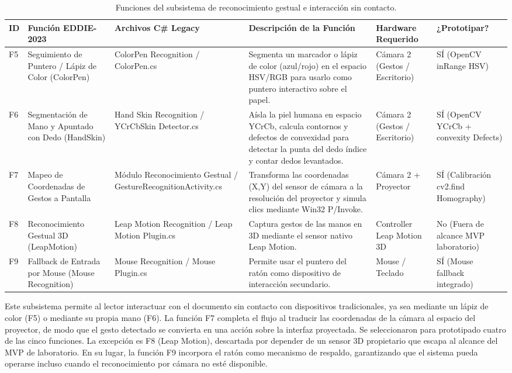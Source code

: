 \begin{table}[H]
    \centering
    \caption{Funciones del subsistema de reconocimiento gestual e interacción sin contacto.}
    \label{tab:func_reconocimiento_gestual}
    \begin{small}
    \begin{tabular}{L{0.6cm} L{2.2cm} L{2.2cm} L{4.1cm} L{1.6cm} L{1.8cm}}
        \toprule
        ID & Función EDDIE-2023 & Archivos C\# Legacy & Descripción de la Función & Hardware Requerido & ¿Prototipar? \\ \midrule
        F5 & Seguimiento de Puntero / Lápiz de Color (ColorPen) & ColorPen Recognition / ColorPen.cs & Segmenta un marcador o lápiz de color (azul/rojo) en el espacio HSV/RGB para usarlo como puntero interactivo sobre el papel. & Cámara 2 (Gestos / Escritorio) & SÍ (OpenCV inRange HSV) \\ \midrule
        F6 & Segmentación de Mano y Apuntado con Dedo (HandSkin) & Hand Skin Recognition / YCrCbSkin Detector.cs & Aísla la piel humana en espacio YCrCb, calcula contornos y defectos de convexidad para detectar la punta del dedo índice y contar dedos levantados. & Cámara 2 (Gestos / Escritorio) & SÍ (OpenCV YCrCb + convexity Defects) \\ \midrule
        F7 & Mapeo de Coordenadas de Gestos a Pantalla & Módulo Reconocimiento Gestual / GestureRecognitionActivity.cs & Transforma las coordenadas (X,Y) del sensor de cámara a la resolución del proyector y simula clics mediante Win32 P/Invoke. & Cámara 2 + Proyector & SÍ (Calibración cv2.find Homography) \\ \midrule
        F8 & Reconocimiento Gestual 3D (LeapMotion) & Leap Motion Recognition / Leap Motion Plugin.cs & Captura gestos de las manos en 3D mediante el sensor nativo Leap Motion. & Controller Leap Motion 3D & No (Fuera de alcance MVP laboratorio) \\ \midrule
        F9 & Fallback de Entrada por Mouse (Mouse Recognition) & Mouse Recognition / Mouse Plugin.cs & Permite usar el puntero del ratón como dispositivo de interacción secundario. & Mouse / Teclado & SÍ (Mouse fallback integrado) \\ \bottomrule
    \end{tabular}
    \end{small}
\end{table}
 
Este subsistema permite al lector interactuar con el documento sin contacto con dispositivos tradicionales, ya sea mediante un lápiz de color (F5) o mediante su propia mano (F6). La función F7 completa el flujo al traducir las coordenadas de la cámara al espacio del proyector, de modo que el gesto detectado se convierta en una acción sobre la interfaz proyectada. Se seleccionaron para prototipado cuatro de las cinco funciones. La excepción es F8 (Leap Motion), descartada por depender de un sensor 3D propietario que escapa al alcance del MVP de laboratorio. En su lugar, la función F9 incorpora el ratón como mecanismo de respaldo, garantizando que el sistema pueda operarse incluso cuando el reconocimiento por cámara no esté disponible.
 
